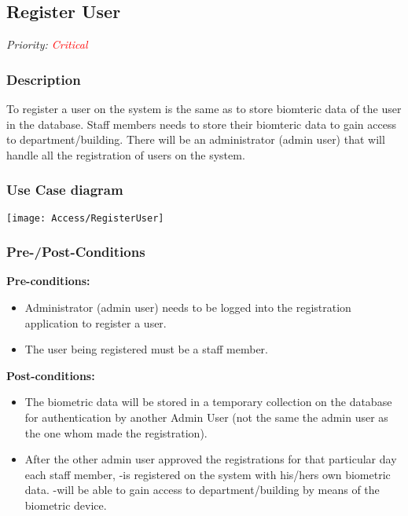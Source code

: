 \subsection{Register User}
\textit{Priority: \textcolor{red}{Critical}} 

\subsubsection{Description}
To register a user on the system is the same as to store biomteric data of the user in the database.
Staff members needs to store their biomteric data to gain access to department/building. There will be an administrator (admin user) that will handle all the registration of users on the system.

\subsubsection{Use Case diagram}
\texttt{[image: Access/RegisterUser]}

\subsubsection{Pre-/Post-Conditions}
\textbf{Pre-conditions:} 
	\begin{itemize}
		\item Administrator (admin user) needs to be logged into the registration application to register a user.
		\item The user being registered must be a staff member.
	\end{itemize}
\textbf{ Post-conditions:} 
	\begin{itemize}
		\item The biometric data will be stored in a temporary collection on the database for authentication by another Admin User (not the same the admin user as the one whom made the registration).
		\item After the other admin user approved the registrations for that particular day each staff member, 
			\subitem-is registered on the system with his/hers own biometric data.
			\subitem-will be able to gain access to department/building by means of the biometric device.
	\end{itemize}